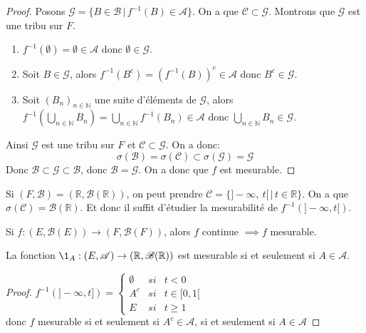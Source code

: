 \begin{proof}
	Posons $\mathscr{G} = \{ B \in \mathscr{B} \, | \, f^{-1}(B) \in \mathscr{A} \}$. On a que $\mathscr{C} \subset \mathscr{G}$.
	Montrons que $\mathscr{G}$ est une tribu sur $F$.
	\begin{enumerate}
		\item $f^{-1}(\emptyset) = \emptyset \in \mathscr{A}$ donc $\emptyset \in \mathscr{G}$.
		\item Soit $B \in \mathscr{G}$, alors $f^{-1}(B^c) = (f^{-1}(B))^c \in \mathscr{A}$ donc $B^c \in \mathscr{G}$.
		\item Soit $(B_n)_{n \in \mathbb{N}}$ une suite d'éléments de $\mathscr{G}$, alors
		      $f^{-1}(\bigcup\limits_{n \in \mathbb{N}} B_n) = \bigcup\limits_{n \in \mathbb{N}} f^{-1}(B_n) \in \mathscr{A}$ donc
		      $\bigcup\limits_{n \in \mathbb{N}} B_n \in \mathscr{G}$.
	\end{enumerate}
	Ainsi $\mathscr{G}$ est une tribu sur $F$ et $\mathscr{C} \subset \mathscr{G}$.
	On a donc:
	\[ \sigma(\mathscr{B}) = \sigma(\mathscr{C}) \subset \sigma(\mathscr{G}) = \mathscr{G} \]
	Donc $\mathscr{B} \subset \mathscr{G} \subset \mathscr{B}$, donc $\mathscr{B} = \mathscr{G}$.
	On a donc que $f$ est mesurable.
\end{proof}


\begin{example}[Application]
	Si $(F, \mathscr{B}) = (\mathbb{R}, \mathscr{B}(\mathbb{R}))$, on peut prendre $\mathscr{C} = \{ ]-\infty,\   t[ \, | \, t \in \mathbb{R} \}$. On a que
				$\sigma(\mathscr{C}) = \mathscr{B}(\mathbb{R})$. Et donc il suffit d'étudier la mesurabilité de $f^{-1}(]-\infty, t[)$.
\end{example}


\begin{remarque}
	Si $f : (E,\mathscr{B}(E)) \rightarrow (F,\mathscr{B}(F))$, alors $f$ continue $\implies f$ mesurable.
\end{remarque}


\begin{prop}
	La fonction $\1_A : (E,\mathscr{A}) \rightarrow (\mathbb{R},\mathscr{B}(\mathbb{R}))$ est mesurable si et seulement si $A \in \mathscr{A}$.
\end{prop}

\begin{proof}
	$f^{-1}(]-\infty, t]) = \left\{ \begin{array}{crl}
			\emptyset & si & t < 0       \\
			A^c       & si & t \in [0,1[ \\
			E         & si & t \geq 1
		\end{array}
		\right.$\\
	donc $f$ mesurable si et seulement si $A^c\in \mathscr{A}$, si et seulement si $A\in \mathscr{A}$
\end{proof}

